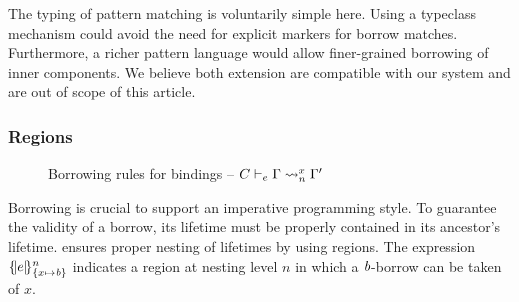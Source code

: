 The typing of pattern matching is voluntarily simple here.
Using a typeclass mechanism could avoid the need for explicit markers
for borrow matches. Furthermore, a richer pattern language would allow
finer-grained borrowing of inner components.
We believe both extension are compatible with our system
and are out of scope of this article.

\subsubsection{Regions}
\label{sdtyping:regions}
\begin{figure}[tp]
  \begin{minipage}{\linewidth}
    \centering


    \begin{mathpar}
    \end{mathpar}
    \caption{Borrowing rules for bindings -- $\lregion{C}{x}{\E}{\E'}$}
    \label{env:rule:borrow}
  \end{minipage}
\end{figure}

Borrowing is crucial to support an imperative programming style.
To guarantee the validity of a borrow, its lifetime must be properly contained in its
ancestor's lifetime. \lang ensures proper nesting of lifetimes by using
regions. The expression $\region{\Sone x\BORROW}{e}$ indicates a
region at nesting level $n$ in which a $\BORROW$-borrow can be taken of $x$.

